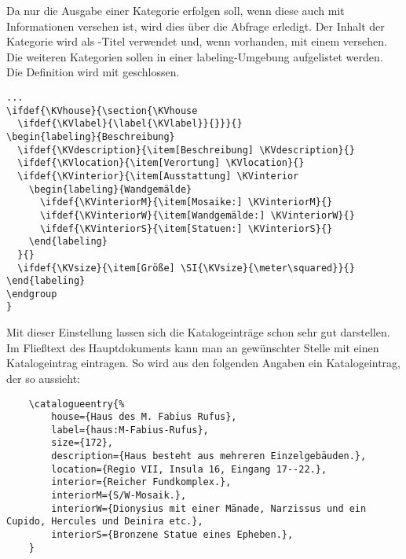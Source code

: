 Da nur die Ausgabe einer Kategorie erfolgen soll,
wenn diese auch mit Informationen versehen ist,
wird dies über die Abfrage  erledigt.
Der Inhalt der Kategorie  wird als -Titel verwendet und, wenn vorhanden, mit einem  versehen.
Die weiteren Kategorien sollen in einer {labeling}-Umgebung aufgelistet werden.
Die Definition wird mit  geschlossen.
\begin{lstlisting}[caption={Definition der Katalogeinträge, Fortsetzung},label={lis:cat-2}]
...
\ifdef{\KVhouse}{\section{\KVhouse
  \ifdef{\KVlabel}{\label{\KVlabel}}{}}}{}
\begin{labeling}{Beschreibung}
  \ifdef{\KVdescription}{\item[Beschreibung] \KVdescription}{}
  \ifdef{\KVlocation}{\item[Verortung] \KVlocation}{}
  \ifdef{\KVinterior}{\item[Ausstattung] \KVinterior
    \begin{labeling}{Wandgemälde}
      \ifdef{\KVinteriorM}{\item[Mosaike:] \KVinteriorM}{}
      \ifdef{\KVinteriorW}{\item[Wandgemälde:] \KVinteriorW}{}
      \ifdef{\KVinteriorS}{\item[Statuen:] \KVinteriorS}{}
    \end{labeling}
  }{}
  \ifdef{\KVsize}{\item[Größe] \SI{\KVsize}{\meter\squared}}{}
\end{labeling}
\endgroup
}
\end{lstlisting}

Mit dieser Einstellung lassen sich die Katalogeinträge schon sehr gut darstellen.
Im Fließtext des Hauptdokuments kann man an gewünschter Stelle mit  einen Katalogeintrag eintragen.
So wird aus den folgenden Angaben ein Katalogeintrag, der so aussieht:
\begin{lstlisting}
    \catalogueentry{%
        house={Haus des M. Fabius Rufus},
        label={haus:M-Fabius-Rufus},
        size={172},
        description={Haus besteht aus mehreren Einzelgebäuden.},
        location={Regio VII, Insula 16, Eingang 17--22.},
        interior={Reicher Fundkomplex.},
        interiorM={S/W-Mosaik.},
        interiorW={Dionysius mit einer Mänade, Narzissus und ein Cupido, Hercules und Deinira etc.},
        interiorS={Bronzene Statue eines Epheben.},
    }
\end{lstlisting}


